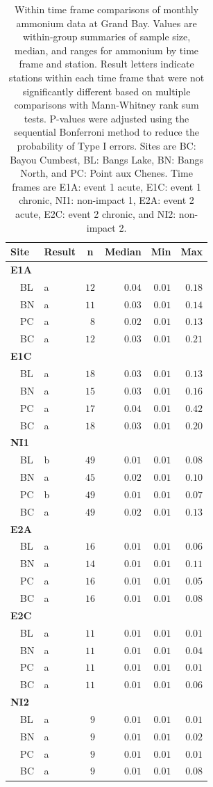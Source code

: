 \documentclass[letterpaper,12pt]{article}\usepackage[]{graphicx}\usepackage[]{color}
\begin{document}
\clearpage

\begin{table}[!tbp]
\caption{Within time frame comparisons of monthly ammonium data at Grand Bay.  Values are within-group summaries of sample size, median, and ranges for ammonium by time frame and station.  Result letters indicate stations within each time frame that were not significantly different based on multiple comparisons with Mann-Whitney rank sum tests.  P-values were adjusted using the sequential Bonferroni method to reduce the probability of Type I errors. Sites are BC: Bayou Cumbest, BL: Bangs Lake, BN: Bangs North, and PC: Point aux Chenes.  Time frames are E1A: event 1 acute, E1C: event 1 chronic, NI1: non-impact 1, E2A: event 2 acute, E2C: event 2 chronic, and NI2: non-impact 2.\label{tab:ammontab2}} 
\begin{center}
\begin{tabular}{llrrrr}
\hline\hline
\multicolumn{1}{l}{Site}&\multicolumn{1}{c}{Result}&\multicolumn{1}{c}{n}&\multicolumn{1}{c}{Median}&\multicolumn{1}{c}{Min}&\multicolumn{1}{c}{Max}\tabularnewline
\hline
{\bfseries E1A}&&&&&\tabularnewline
~~BL&a&$12$&$0.04$&$0.01$&$0.18$\tabularnewline
~~BN&a&$11$&$0.03$&$0.01$&$0.14$\tabularnewline
~~PC&a&$ 8$&$0.02$&$0.01$&$0.13$\tabularnewline
~~BC&a&$12$&$0.03$&$0.01$&$0.21$\tabularnewline
\hline
{\bfseries E1C}&&&&&\tabularnewline
~~BL&a&$18$&$0.03$&$0.01$&$0.13$\tabularnewline
~~BN&a&$15$&$0.03$&$0.01$&$0.16$\tabularnewline
~~PC&a&$17$&$0.04$&$0.01$&$0.42$\tabularnewline
~~BC&a&$18$&$0.03$&$0.01$&$0.20$\tabularnewline
\hline
{\bfseries NI1}&&&&&\tabularnewline
~~BL&b&$49$&$0.01$&$0.01$&$0.08$\tabularnewline
~~BN&a&$45$&$0.02$&$0.01$&$0.10$\tabularnewline
~~PC&b&$49$&$0.01$&$0.01$&$0.07$\tabularnewline
~~BC&a&$49$&$0.02$&$0.01$&$0.13$\tabularnewline
\hline
{\bfseries E2A}&&&&&\tabularnewline
~~BL&a&$16$&$0.01$&$0.01$&$0.06$\tabularnewline
~~BN&a&$14$&$0.01$&$0.01$&$0.11$\tabularnewline
~~PC&a&$16$&$0.01$&$0.01$&$0.05$\tabularnewline
~~BC&a&$16$&$0.01$&$0.01$&$0.08$\tabularnewline
\hline
{\bfseries E2C}&&&&&\tabularnewline
~~BL&a&$11$&$0.01$&$0.01$&$0.01$\tabularnewline
~~BN&a&$11$&$0.01$&$0.01$&$0.04$\tabularnewline
~~PC&a&$11$&$0.01$&$0.01$&$0.01$\tabularnewline
~~BC&a&$11$&$0.01$&$0.01$&$0.06$\tabularnewline
\hline
{\bfseries NI2}&&&&&\tabularnewline
~~BL&a&$ 9$&$0.01$&$0.01$&$0.01$\tabularnewline
~~BN&a&$ 9$&$0.01$&$0.01$&$0.02$\tabularnewline
~~PC&a&$ 9$&$0.01$&$0.01$&$0.01$\tabularnewline
~~BC&a&$ 9$&$0.01$&$0.01$&$0.08$\tabularnewline
\hline
\end{tabular}\end{center}
\end{table}
\end{document}
